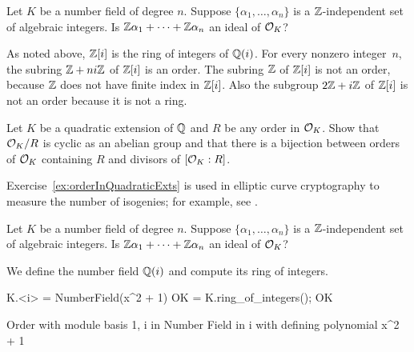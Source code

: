 \begin{exercise} %
  Let $K$ be a number field of degree $n$.
  Suppose $\{\alpha_1,\dots,\alpha_n\}$ is a $\mathbb{Z}$-independent set of
  algebraic integers. Is $\mathbb{Z}\alpha_1 + \cdots + \mathbb{Z}\alpha_n$ an ideal
  of $\mathcal{O}_K$?
\end{exercise}

As noted above, $\mathbb{Z}[i]$ is the ring of integers of $\mathbb{Q}(i)$.  For every
nonzero integer~$n$, the subring $\mathbb{Z}+ni\mathbb{Z}$ of $\mathbb{Z}[i]$ is an order.
The subring $\mathbb{Z}$ of $\mathbb{Z}[i]$ is not an order, because $\mathbb{Z}$ does not
have finite index in $\mathbb{Z}[i]$.  Also the subgroup $2\mathbb{Z} + i\mathbb{Z}$ of
$\mathbb{Z}[i]$ is not an order because it is not a ring.

\begin{exercise}\label{ex:orderInQuadraticExts}
  Let $K$ be a quadratic extension of $\mathbb{Q}$
  and $R$ be any order in $\mathcal{O}_K$.
  Show that $\mathcal{O}_K/R$ is cyclic as an abelian group
  and that there is a bijection between orders of
  $\mathcal{O}_K$ containing $R$ and divisors of $[\mathcal{O}_K:R]$.
\end{exercise}

\begin{remark}
  Exercise~\ref{ex:orderInQuadraticExts} is used in
  elliptic curve cryptography to measure the number
  of isogenies; for example, see \cite[\S11.2]{Koblitz2011781}.
\end{remark}

\begin{exercise} %
  Let $K$ be a number field of degree $n$. Suppose $\{\alpha_1,\dots,\alpha_n\}$ is a $\mathbb{Z}$-independent set of algebraic integers. Is $\mathbb{Z}\alpha_1 + \cdots + \mathbb{Z}\alpha_n$ an ideal of $\mathcal{O}_K$?
\end{exercise}

We define the number field $\mathbb{Q}(i)$ and compute its
ring of integers.
\begin{sagecode}
\begin{sagecell}
K.<i> = NumberField(x^2 + 1)
OK = K.ring_of_integers(); OK
\end{sagecell}
\begin{sageout}
Order with module basis 1, i in Number Field in i with
defining polynomial x^2 + 1
\end{sageout}
\end{sagecode}

